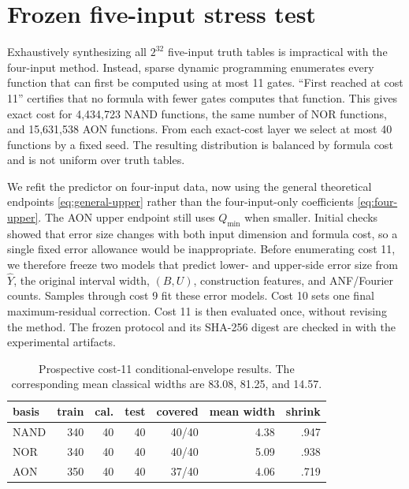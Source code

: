 \documentclass[10pt]{article}
\begin{document}
\FloatBarrier
\section{Frozen five-input stress test}

Exhaustively synthesizing all $2^{32}$ five-input truth tables is impractical
with the four-input method.  Instead, sparse dynamic programming enumerates
every function that can first be computed using at most 11 gates.  ``First
reached at cost 11'' certifies that no formula with fewer gates computes that
function.  This gives exact cost
for 4,434,723 NAND functions, the same number of NOR functions, and 15,631,538
AON functions.  From each exact-cost layer we select at most 40 functions by
a fixed seed.  The resulting distribution is balanced by formula cost and is
not uniform over truth tables.

We refit the predictor on four-input data, now using the general theoretical
endpoints \eqref{eq:general-upper} rather than the four-input-only coefficients
\eqref{eq:four-upper}.  The AON upper
endpoint still uses $Q_{\min}$ when smaller.  Initial checks showed that error
size changes with both input dimension and formula cost, so a single fixed
error allowance would be inappropriate.  Before enumerating cost 11, we
therefore freeze two models that predict lower- and upper-side error size from
$\widehat Y$, the original interval width, $(B,U)$, construction features,
and ANF/Fourier counts.  Samples through cost 9 fit these error models.  Cost
10 sets one final maximum-residual correction.  Cost 11 is then evaluated
once, without revising the method.
The frozen protocol and its SHA-256 digest are checked in with the
experimental artifacts.

\begin{table}[H]
\centering\small
\begin{tabular}{lrrrrrr}
\toprule
basis & train & cal. & test & covered & mean width & shrink\\
\midrule
NAND & 340 & 40 & 40 & 40/40 & 4.38 & .947\\
NOR  & 340 & 40 & 40 & 40/40 & 5.09 & .938\\
AON  & 350 & 40 & 40 & 37/40 & 4.06 & .719\\
\bottomrule
\end{tabular}
\caption{Prospective cost-11 conditional-envelope results.  The corresponding
mean classical widths are 83.08, 81.25, and 14.57.}
\label{tab:n5}
\end{table}
\end{document}
